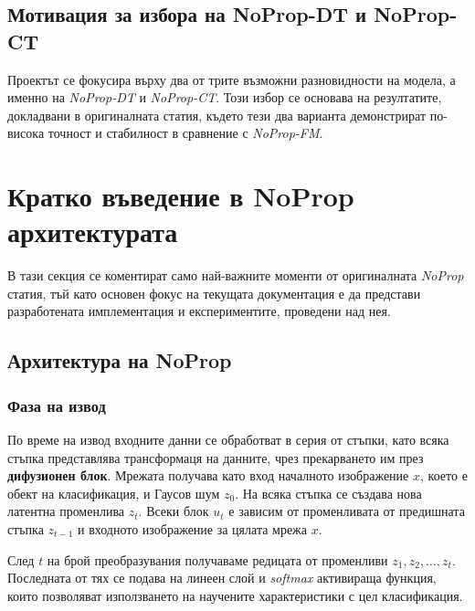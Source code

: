 \documentclass[a4paper,11pt]{article}
\begin{document}
\subsection{Мотивация за избора на NoProp-DT и NoProp-CT}

Проектът се фокусира върху два от трите възможни разновидности на модела, а именно на \emph{NoProp-DT} и \emph{NoProp-CT}. Този избор се основава на резултатите, докладвани в оригиналната статия, където тези два варианта демонстрират по-висока точност и стабилност в сравнение с \emph{NoProp-FM}.

\newpage

\section{Кратко въведение в NoProp архитектурата}

В тази секция се коментират само най-важните моменти от оригиналната \emph{NoProp} статия\cite{li2025noproptrainingneuralnetworks}, тъй като основен фокус на текущата документация е да представи разработената имплементация и експериментите, проведени над нея.

\subsection{Архитектура на NoProp}
\subsubsection{Фаза на извод}
По време на извод входните данни се обработват в серия от стъпки, като всяка стъпка представлява трансформаця на данните, чрез прекарването им през \textbf{дифузионен блок}. Мрежата получава като вход началното изображение \(x\), което е обект на класификация, и Гаусов шум \(z_{0}\). На всяка стъпка се създава нова латентна променлива \(z_t\). Всеки блок \(u_{t}\) е зависим от променливата от предишната стъпка \(z_{t-1}\) и входното изображение за цялата мрежа \(x\). 

След $t$ на брой преобразувания получаваме редицата от променливи $z_{1}, z_{2}, \dots, z_{t}$. Последната от тях се подава на линеен слой и \emph{softmax} активираща функция, които позволяват използването на научените характеристики с цел класификация. 
\end{document}
